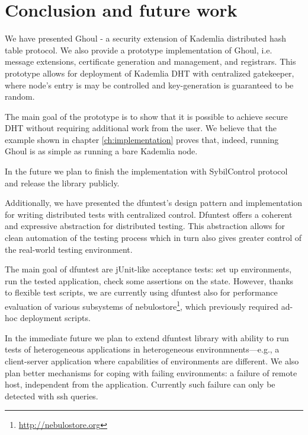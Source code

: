 \chapter{Conclusion and future work}
\label{ch:conclusion}
We have presented Ghoul - a security extension of Kademlia distributed hash table protocol.
We also provide a prototype implementation of Ghoul, i.e. message extensions, certificate generation and management, and registrars.
This prototype allows for deployment of Kademlia DHT with centralized gatekeeper, where node's entry is may be controlled and key-generation is guaranteed to be random.

The main goal of the prototype is to show that it is possible to achieve secure DHT without requiring additional work from the user.
We believe that the example shown in chapter \ref{ch:implementation} proves that, indeed, running Ghoul is as simple as running a bare Kademlia node.

In the future we plan to finish the implementation with SybilControl protocol and release the library publicly.

Additionally, we have presented the dfuntest's design pattern and implementation for writing distributed tests with centralized control.
Dfuntest offers a coherent and expressive abstraction for distributed testing.
This abstraction allows for clean automation of the testing process which in turn also gives greater control of the real-world testing environment.

The main goal of dfuntest are jUnit-like acceptance tests: set up environments,
run the tested application, check some assertions on the state. However, thanks
to flexible test scripts, we are currently using dfuntest also for performance
evaluation of various subsystems of
nebulostore\footnote{\url{http://nebulostore.org}}, which previously required ad-hoc deployment scripts.

In the immediate future we plan to extend dfuntest library with ability to run tests of heterogeneous applications in heterogeneous environmnents---e.g., a client-server application where capabilities of environments are different.
We also plan better mechanisms for coping with failing environments: a failure of remote host, independent from the application. Currently such failure can only be detected with ssh queries.
